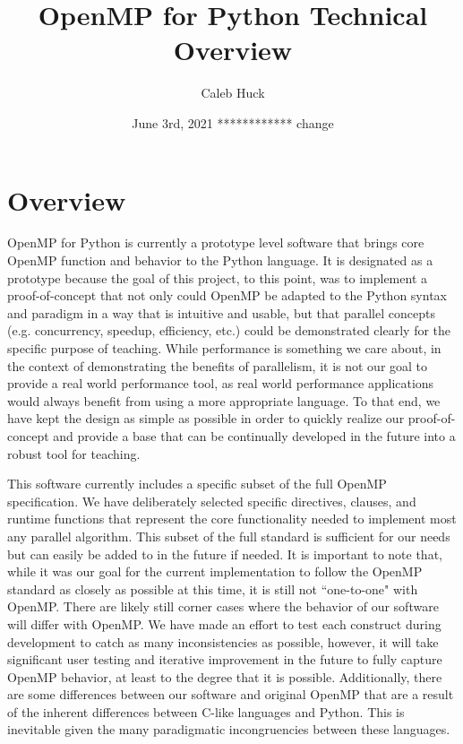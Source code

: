\documentclass[letterpaper,12pt]{article} %
\begin{document}
\title{\Large{\textbf{OpenMP for Python Technical Overview}}}
\author{Caleb Huck}
\date{June 3rd, 2021 ************ change}
\maketitle

\section{Overview}
OpenMP for Python is currently a prototype level software that brings core OpenMP function and behavior to the Python language. It is designated as a prototype because the goal of this project, to this point, was to implement a proof-of-concept that not only could OpenMP be adapted to the Python syntax and paradigm in a way that is intuitive and usable, but that parallel concepts (e.g. concurrency, speedup, efficiency, etc.) could be demonstrated clearly for the specific purpose of teaching. While performance is something we care about, in the context of demonstrating the benefits of parallelism, it is not our goal to provide a real world performance tool, as real world performance applications would always benefit from using a more appropriate language. To that end, we have kept the design as simple as possible in order to quickly realize our proof-of-concept and provide a base that can be continually developed in the future into a robust tool for teaching. 

This software currently includes a specific subset of the full OpenMP specification. We have deliberately selected specific directives, clauses, and runtime functions that represent the core functionality needed to implement most any parallel algorithm. This subset of the full standard is sufficient for our needs but can easily be added to in the future if needed. It is important to note that, while it was our goal for the current implementation to follow the OpenMP standard as closely as possible at this time, it is still not ``one-to-one" with OpenMP. There are likely still corner cases where the behavior of our software will differ with OpenMP. We have made an effort to test each construct during development to catch as many inconsistencies as possible, however, it will take significant user testing and iterative improvement in the future to fully capture OpenMP behavior, at least to the degree that it is possible. Additionally, there are some differences between our software and original OpenMP that are a result of the inherent differences between C-like languages and Python. This is inevitable given the many paradigmatic incongruencies between these languages. 
\end{document}
